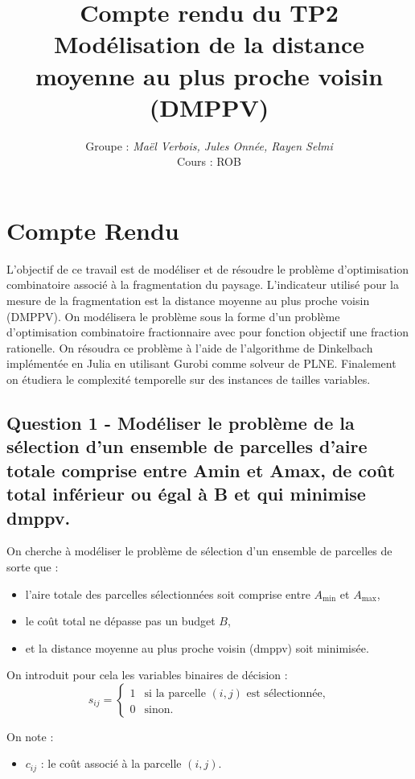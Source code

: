 \documentclass[a4paper,11pt]{article}
\title{\textbf{Compte rendu du TP2}\\[4pt]
\large Modélisation de la distance moyenne au plus proche voisin (DMPPV)}
\author{Groupe : \textit{Maël Verbois, Jules Onnée, Rayen Selmi} \\[2pt] Cours : ROB}
\begin{document}
\maketitle


\section{Compte Rendu}
L’objectif de ce travail est de modéliser et de résoudre le problème d'optimisation combinatoire associé à la fragmentation
du paysage. L'indicateur utilisé pour la mesure de la fragmentation est la distance moyenne au plus proche voisin (DMPPV).
On modélisera le problème sous la forme d'un problème d'optimisation combinatoire fractionnaire avec pour fonction objectif une 
fraction rationelle. On résoudra ce problème à l'aide de l'algorithme de Dinkelbach implémentée en Julia en utilisant Gurobi comme solveur de PLNE.
Finalement on étudiera le complexité temporelle sur des instances de tailles variables.


\subsection*{Question 1 -  Modéliser le problème de la sélection d'un ensemble de parcelles d'aire totale comprise
entre Amin et Amax, de coût total inférieur ou égal à B et qui minimise dmppv.
}

On cherche à modéliser le problème de sélection d’un ensemble de parcelles de sorte que :
\begin{itemize}
    \item l’aire totale des parcelles sélectionnées soit comprise entre $A_{\min}$ et $A_{\max}$,
    \item le coût total ne dépasse pas un budget $B$,
    \item et la distance moyenne au plus proche voisin (dmppv) soit minimisée.
\end{itemize}

On introduit pour cela les variables binaires de décision :
\[
s_{ij} =
\begin{cases}
1 & \text{si la parcelle } (i,j) \text{ est sélectionnée,}\\
0 & \text{sinon.}
\end{cases}
\]

On note :
\begin{itemize}
    \item $c_{ij}$ : le coût associé à la parcelle $(i,j)$.
\end{itemize}
\end{document}
